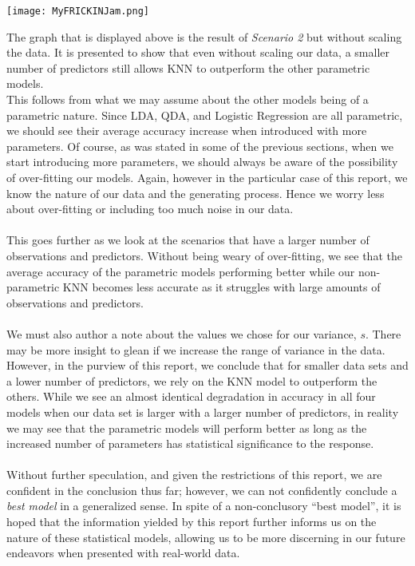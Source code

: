 \documentclass[11pt, oneside]{article}
\begin{document}
\begin{center}
\graphicspath{ {MyFRICKINJam.png} }
\texttt{[image: MyFRICKINJam.png]}
\end{center}

The graph that is displayed above is the result of \emph{Scenario 2} but without scaling the data. It is presented to show that even without scaling our data, a smaller number of predictors still allows KNN to outperform the other parametric models.\\

This follows from what we may assume about the other models being of a parametric nature. Since LDA, QDA, and Logistic Regression are all parametric, we should see their average accuracy increase when introduced with more parameters. Of course, as was stated in some of the previous sections, when we start introducing more parameters, we should always be aware of the possibility of over-fitting our models. Again, however in the particular case of this report, we know the nature of our data and the generating process. Hence we worry less about over-fitting or including too much noise in our data.\\
\\
This goes further as we look at the scenarios that have a larger number of observations and predictors. Without being weary of over-fitting, we see that the average accuracy of the parametric models performing better while our non-parametric KNN becomes less accurate as it struggles with large amounts of observations and predictors.\\
\\
We must also author a note about the values we chose for our variance, $s$. There may be more insight to glean if we increase the range of variance in the data. However, in the purview of this report, we conclude that for smaller data sets and a lower number of predictors, we rely on the KNN model to outperform the others. While we see an almost identical degradation in accuracy in all four models when our data set is larger with a larger number of predictors, in reality we may see that the parametric models will perform better as long as the increased number of parameters has statistical significance to the response.\\
\\
Without further speculation, and given the restrictions of this report, we are confident in the conclusion thus far; however, we can not confidently conclude a \emph{best model} in a generalized sense. In spite of a non-conclusory ``best model'', it is hoped that the information yielded by this report further informs us on the nature of these statistical models, allowing us to be more discerning in our future endeavors when presented with real-world data.  
\end{document}
